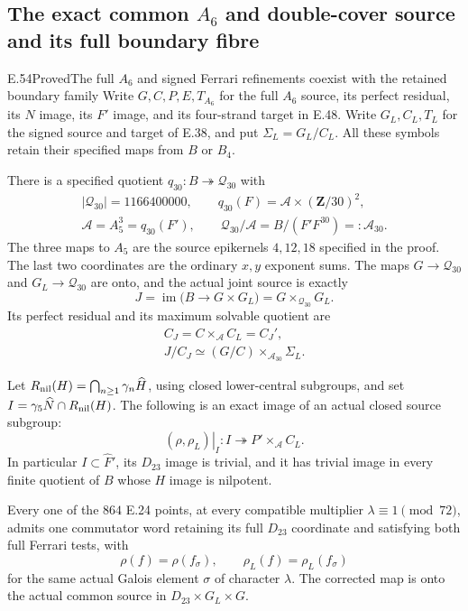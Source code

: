 \subsection{The exact common $A_6$ and double-cover source and its full boundary fibre}

\begin{statement}{E.54}{Proved}{The full $A_6$ and signed Ferrari refinements coexist with the retained boundary family}
Write $G,C,P,E,T_{A_6}$ for the full $A_6$ source, its
perfect residual, its $N$ image, its $F'$ image, and its
four-strand target in E.48.  Write $G_L,C_L,T_L$ for
the signed source and target of E.38, and put
$\Sigma_L=G_L/C_L$.  All these symbols retain their
specified maps from $B$ or $B_4$.

There is a specified quotient $q_{30}:B\twoheadrightarrow
\mathcal Q_{30}$ with
\[
 \begin{gathered}
 |\mathcal Q_{30}|=1166400000,\qquad
 q_{30}(F)=\mathcal A\times(\mathbf Z/30)^2,\\
 \mathcal A=A_5^3=q_{30}(F'),\qquad
 \mathcal Q_{30}/\mathcal A
       =B/(F'F^{30})=:\mathcal A_{30}.
 \end{gathered}
 \tag{E.54.1}
\]
The three maps to $A_5$ are the source epikernels
$4,12,18$ specified in the proof.  The last two coordinates
are the ordinary $x,y$ exponent sums.  The maps $G\to
\mathcal Q_{30}$ and $G_L\to\mathcal Q_{30}$ are onto,
and the actual joint source is exactly
\[
 J=\operatorname{im}\bigl(B\longrightarrow G\times G_L\bigr)
     =G\times_{\mathcal Q_{30}}G_L.
 \tag{E.54.2}
\]
Its perfect residual and its maximum solvable quotient are
\[
 \begin{gathered}
 C_J=C\times_{\mathcal A}C_L=C_J',\\
 J/C_J\simeq (G/C)\times_{\mathcal A_{30}}\Sigma_L.
 \end{gathered}
 \tag{E.54.3}
\]

Let $R_{\rm nil}(H)=\bigcap_{n\ge1}\gamma_n\widehat H$,
using closed lower-central subgroups, and set
$I=\gamma_5\widehat N\cap R_{\rm nil}(H)$.
The following is an exact image of an actual closed source
subgroup:
\[
 \left.(\rho,\rho_L)\right|_I:
 I\twoheadrightarrow
       P'\times_{\mathcal A}C_L.
 \tag{E.54.4}
\]
In particular $I\subset\widehat F'$, its $D_{23}$ image is
trivial, and it has trivial image in every finite quotient
of $B$ whose $H$ image is nilpotent.

Every one of the $864$ E.24 points, at every compatible
multiplier $\lambda\equiv1\pmod{72}$, admits one commutator
word retaining its full $D_{23}$ coordinate and satisfying
both full Ferrari tests, with
\[
       \rho(f)=\rho(f_\sigma),\qquad
       \rho_L(f)=\rho_L(f_\sigma)
 \tag{E.54.5}
\]
for the same actual Galois element $\sigma$ of character
$\lambda$.  The corrected map is onto the actual common
source in $D_{23}\times G_L\times G$.


\end{statement}
